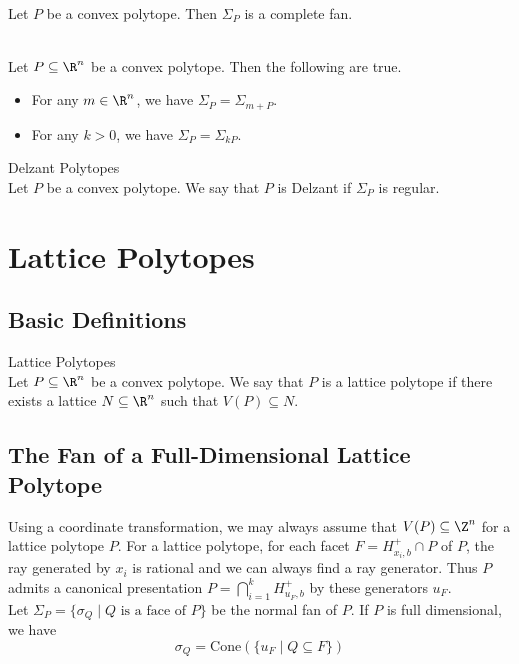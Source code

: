 \documentclass[a4paper]{article}
\begin{document}
\begin{lmm}{}{}\\
Let $P$ be a convex polytope. Then $\Sigma_P$ is a complete fan. 
\end{lmm}

\begin{lmm}{}{}\\
Let $P\subseteq\R^n$ be a convex polytope. Then the following are true. 
\begin{itemize}
\item For any $m\in\R^n$, we have $\Sigma_P=\Sigma_{m+P}$. 
\item For any $k>0$, we have $\Sigma_P=\Sigma_{kP}$. 
\end{itemize}
\end{lmm}

\begin{defn}{Delzant Polytopes}{}\\
Let $P$ be a convex polytope. We say that $P$ is Delzant if $\Sigma_P$ is regular. 
\end{defn}

\pagebreak
\section{Lattice Polytopes}
\subsection{Basic Definitions}
\begin{defn}{Lattice Polytopes}{}\\
Let $P\subseteq\R^n$ be a convex polytope. We say that $P$ is a lattice polytope if there exists a lattice $N\subseteq\R^n$ such that $V(P)\subseteq N$. 
\end{defn}

\subsection{The Fan of a Full-Dimensional Lattice Polytope}
Using a coordinate transformation, we may always assume that $V(P)\subseteq\Z^n$ for a lattice polytope $P$. For a lattice polytope, for each facet $F=H_{x_i,b}^+\cap P$ of $P$, the ray generated by $x_i$ is rational and we can always find a ray generator. Thus $P$ admits a canonical presentation $P=\bigcap_{i=1}^kH_{u_F,b}^+$ by these generators $u_F$. \\

Let $\Sigma_P=\{\sigma_Q\;|\;Q\text{ is a face of }P\}$ be the normal fan of $P$. If $P$ is full dimensional, we have $$\sigma_Q=\text{Cone}(\{u_F\;|\;Q\subseteq F\})$$
\end{document}
